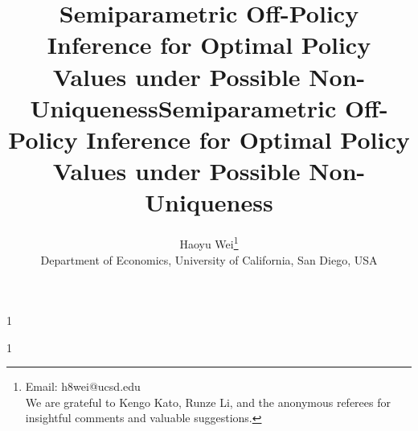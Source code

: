 \documentclass[12pt]{article}
\newcommand{\blind}{1}
\theoremstyle{remark}\newtheorem{remark}[theorem]{Remark}\theoremstyle{plain}
\begin{document}
\def\spacingset#1{\renewcommand{\baselinestretch}%
{#1}\small\normalsize} \spacingset{1}



\def\spacingset#1{\renewcommand{\baselinestretch}%
{#1}\small\normalsize} \spacingset{1}



\blind
{
  \title{\bf Semiparametric Off-Policy Inference for Optimal Policy Values under Possible Non-Uniqueness}
  \author{
    Haoyu Wei\thanks{Email: h8wei@ucsd.edu \\ We are grateful to Kengo Kato, Runze Li, and the anonymous referees for insightful comments and valuable suggestions.} \hspace{.2cm}\\
    {\small Department of Economics, University of California, San Diego, USA}}
  \maketitle
} \fi

\blind
{
  \bigskip
  \bigskip
  \bigskip
    \title{\bf Semiparametric Off-Policy Inference for Optimal Policy Values under Possible Non-Uniqueness}
  \medskip
  \maketitle
} \fi
\end{document}

